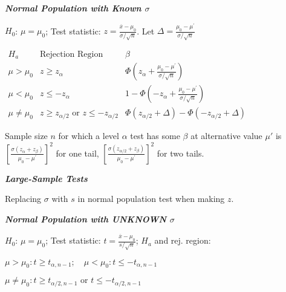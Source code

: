\documentclass{article}
\newcommand{\smalltitle}[1]{
	\noindent
	\textbf{\textit{#1}}
}
\begin{document}
	
	\smalltitle{Normal Population with Known $\sigma$}
	
	$H_0$: $\mu = \mu_0$; Test statistic: $ z = \frac { \overline { x } - \mu _ { 0 } } { \sigma / \sqrt { n } }$. Let 
	$\Delta = \frac { \mu _ { 0 } - \mu ^ { \prime } } { \sigma / \sqrt { n } }$
	
	\centerline{
		$
		\begin{array}{ccc}
		H_a            &               \text{Rejection Region}               &                                                    \beta                                                     \\
		{  \mu > \mu _ { 0 } }   &                   z \geq z_\alpha                   &    \Phi \left( z _ { \alpha } + \frac { \mu _ { 0 } - \mu ^ { \prime } } { \sigma / \sqrt { n } } \right)    \\
		{  \mu < \mu _ { 0 } }   &                  z \leq -z_\alpha                   & 1 - \Phi \left( - z _ { \alpha } + \frac { \mu _ { 0 } - \mu ^ { \prime } } { \sigma / \sqrt { n } } \right) \\
		{  \mu \neq \mu _ { 0 } } & z \geq z_{\alpha/2}  \text{ or } z\leq-z_{\alpha/2} &     \Phi \left( z _ { \alpha / 2 } + \Delta \right) - \Phi \left( - z _ { \alpha / 2 } + \Delta \right)
		\end{array}
		$
	}
	
	
	Sample size $n$ for which a level $\alpha$ test has some $\beta$ at alternative value $\mu'$ is $\left[ \frac { \sigma \left( z _ { \alpha } + z _ { \beta } \right) } { \mu _ { 0 } - \mu ^ { \prime } } \right] ^ { 2 }$ for one tail, $\left[ \frac { \sigma \left( z _ { \alpha / 2 } + z _ { \beta } \right) } { \mu _ { 0 } - \mu ^ { \prime } } \right] ^ { 2 }$ for two tails.
	
	
	
	
	\smalltitle{Large-Sample Tests}
	
	\noindent
	Replacing $\sigma$ with $s$ in normal population test when making $z$.
	
	\smalltitle{Normal Population with UNKNOWN $\sigma$}
	
	$H_0$: $\mu = \mu_{ 0 }$; Test statistic: $t = \frac { \overline { x } - \mu _ { 0 } } { s / \sqrt { n } }$; $H_a$ and rej. region:
	
	$
	{  \mu > \mu _ { 0 } } : { t \geq t _ { \alpha , n - 1 }  }   ;         \quad                  
	{  \mu < \mu _ { 0 } }  : { t \leq - t _ { \alpha , n - 1 }  }            
	$
	
	$
	{  \mu \neq \mu _ { 0 } }  : {  t \geq t _ { \alpha / 2 , n - 1 } \text{ or } t \leq - t _ { \alpha / 2 , n - 1 }  }
	$
	
\end{document}
